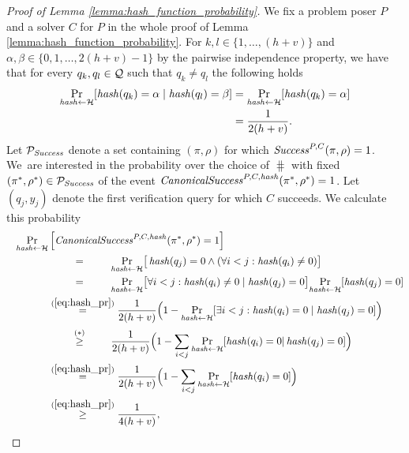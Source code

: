 \begin{proof}[Proof of Lemma \ref{lemma:hash_function_probability}]
We fix a problem poser $P$ and a solver $C$ for $P$ in the whole proof of Lemma \ref{lemma:hash_function_probability}.
For $k,l \in \{1, \dotsc, (h+v)\}$ and $\alpha,\beta \in \{0,1,\dotsc,2(h+v)-1\}$ by the pairwise independence property,
we have that for every $q_k, q_l \in \mathcal{Q}$ such that $q_k \neq q_l$ the following holds
\begin{align}
 \label{eq:hash_pr}
 \underset{\operatorname{\mathit{hash}} \leftarrow \mathcal{H}}{\Pr}[\operatorname{\mathit{hash}}(q_k) = \alpha \mid \operatorname{\mathit{hash}}(q_l) = \beta] &=
 \underset{\operatorname{\mathit{hash}} \leftarrow \mathcal{H}}{\Pr}[\operatorname{\mathit{hash}}(q_k) = \alpha] \notag\\ &= \frac{1}{2(h+v)}.
\end{align}
%
Let $\mathcal{P}_{\operatorname{\mathit{Success}}}$ denote a set containing $(\pi,\rho)$ for which $\operatorname{\mathit{Success}}^{P, C}(\pi, \rho)=1$.
We~are interested in the probability over the choice of $\hash$ with fixed $(\pi^*, \rho^*) \in \mathcal{P}_{\mathit{Success}}$ of
the event $\operatorname{\mathit{CanonicalSuccess}}^{P,C,\operatorname{\mathit{hash}}}(\pi^*, \rho^*) = 1$. Let $(q_j, y_j)$ denote the first verification query for which $C$ succeeds.
We calculate this probability
\begin{align}
  \label{ineq:prob_hash_success}
  \underset{\hash \leftarrow \cH}{\Pr}&\left[\CanonicalSuccess^{P,C,\hash}(\pi^*, \rho^*) = 1\right] \notag\\
  \IndII &\overset{\hphantom{\eqref{eq:hash_pr}}}{=} \underset{\hash \leftarrow \cH}{\Pr}\big[\hash(q_j) = 0 \land (\forall i < j : \hash(q_i) \neq 0)\big] \notag\\
  \IndII &\overset{\hphantom{\eqref{eq:hash_pr}}}{=} \underset{\hash \leftarrow \cH}{\Pr}\big[
  \forall i < j : \hash(q_i) \neq 0 \mid \hash(q_j) = 0\big] \underset{\hash \leftarrow \cH}{\Pr}[\hash(q_j) = 0] \notag\\
  \IndII &\overset{(\ref{eq:hash_pr})}{=} \frac{1}{2(h+v)}\Big(1 -\underset{\hash \leftarrow \cH}{\Pr}[\exists i < j : \hash(q_i) = 0 \mid \hash(q_j) = 0] \Big) \notag\\
  \IndII &\stackrel{\substack{\hphantom{\eqref{eq:hash_pr}}\\(*)}}{\geq} \frac{1}{2(h+v)} \Big( 1 - \sum_{i < j} \underset{\hash \leftarrow \cH}{\Pr}[\hash(q_i) = 0 | \hash(q_j) = 0] \Big) \notag\\
  \IndII &\stackrel{(\ref{eq:hash_pr})}{=} \frac{1}{2(h+v)} \Big( 1 -  \sum_{i < j}\underset{\hash \leftarrow \cH}{\Pr}[\hash(q_i) = 0] \Big) \notag\\
  \IndII &\overset{(\ref{eq:hash_pr})}{\geq} \frac{1}{4(h+v)},

\end{align}
\end{proof}
